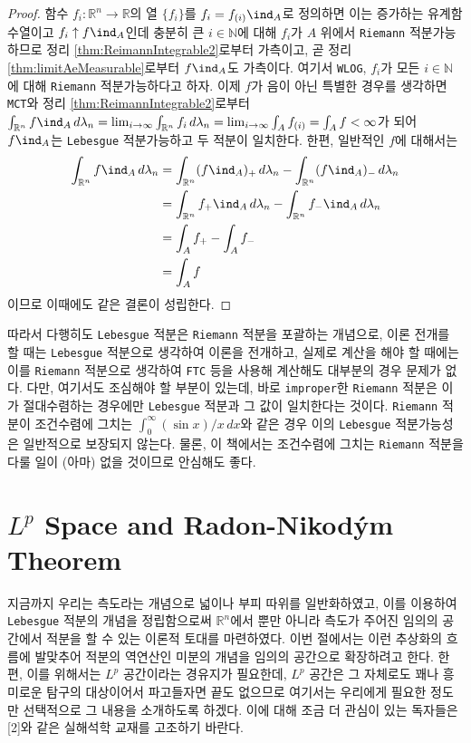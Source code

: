 \begin{proof}
    함수 $f_i:\mathbb{R}^n\to\mathbb{R}$의 열 $\{f_i\}$를 $f_i=f_{(i)}\ind_A$로 정의하면 이는 증가하는 유계함수열이고 $f_i\uparrow f\ind_A$인데 충분히 큰 $i\in\mathbb{N}$에 대해 $f_i$가 $A$ 위에서 \texttt{Riemann} 적분가능하므로 정리 \ref{thm:ReimannIntegrable2}로부터 가측이고, 곧 정리 \ref{thm:limitAeMeasurable}로부터 $f\ind_A$도 가측이다. 여기서 \texttt{WLOG}, $f_i$가 모든 $i\in\mathbb{N}$에 대해 \texttt{Riemann} 적분가능하다고 하자. 이제 $f$가 음이 아닌 특별한 경우를 생각하면 \texttt{MCT}와 정리 \ref{thm:ReimannIntegrable2}로부터 $\int_{\mathbb{R}^n}f\ind_A\,d\lambda_n=\lim_{i\to\infty}\int_{\mathbb{R}^n}f_i\,d\lambda_n=\lim_{i\to\infty}\int_Af_{(i)}=\int_Af<\infty$가 되어 $f\ind_A$는 \texttt{Lebesgue} 적분가능하고 두 적분이 일치한다. 한편, 일반적인 $f$에 대해서는
    \begin{align*}
        \int_{\mathbb{R}^n}f\ind_A\,d\lambda_n&=\int_{\mathbb{R}^n}(f\ind_A)_+\,d\lambda_n-\int_{\mathbb{R}^n}(f\ind_A)_-\,d\lambda_n\\
        &=\int_{\mathbb{R}^n}f_+\ind_A\,d\lambda_n-\int_{\mathbb{R}^n}f_-\ind_A\,d\lambda_n\\
        &=\int_Af_+-\int_Af_-\\
        &=\int_Af
    \end{align*}
    이므로 이때에도 같은 결론이 성립한다.
\end{proof}

따라서 다행히도 \texttt{Lebesgue} 적분은 \texttt{Riemann} 적분을 포괄하는 개념으로, 이론 전개를 할 때는 \texttt{Lebesgue} 적분으로 생각하여 이론을 전개하고, 실제로 계산을 해야 할 때에는 이를 \texttt{Riemann} 적분으로 생각하여 \texttt{FTC} 등을 사용해 계산해도 대부분의 경우 문제가 없다. 다만, 여기서도 조심해야 할 부분이 있는데, 바로 \texttt{improper}한 \texttt{Riemann} 적분은 이가 절대수렴하는 경우에만 \texttt{Lebesgue} 적분과 그 값이 일치한다는 것이다. \texttt{Riemann} 적분이 조건수렴에 그치는 $\int_0^\infty(\sin x)/x\,dx$와 같은 경우 이의 \texttt{Lebesgue} 적분가능성은 일반적으로 보장되지 않는다. 물론, 이 책에서는 조건수렴에 그치는 \texttt{Riemann} 적분을 다룰 일이 (아마) 없을 것이므로 안심해도 좋다.

\section{$L^p$ Space and Radon-Nikod\'ym Theorem}

지금까지 우리는 측도라는 개념으로 넓이나 부피 따위를 일반화하였고, 이를 이용하여 \texttt{Lebesgue} 적분의 개념을 정립함으로써 $\mathbb{R}^n$에서 뿐만 아니라 측도가 주어진 임의의 공간에서 적분을 할 수 있는 이론적 토대를 마련하였다. 이번 절에서는 이런 추상화의 흐름에 발맞추어 적분의 역연산인 미분의 개념을 임의의 공간으로 확장하려고 한다. 한편, 이를 위해서는 $L^p$ 공간이라는 경유지가 필요한데, $L^p$ 공간은 그 자체로도 꽤나 흥미로운 탐구의 대상이어서 파고들자면 끝도 없으므로 여기서는 우리에게 필요한 정도만 선택적으로 그 내용을 소개하도록 하겠다. 이에 대해 조금 더 관심이 있는 독자들은 [2]와 같은 실해석학 교재를 고조하기 바란다.


